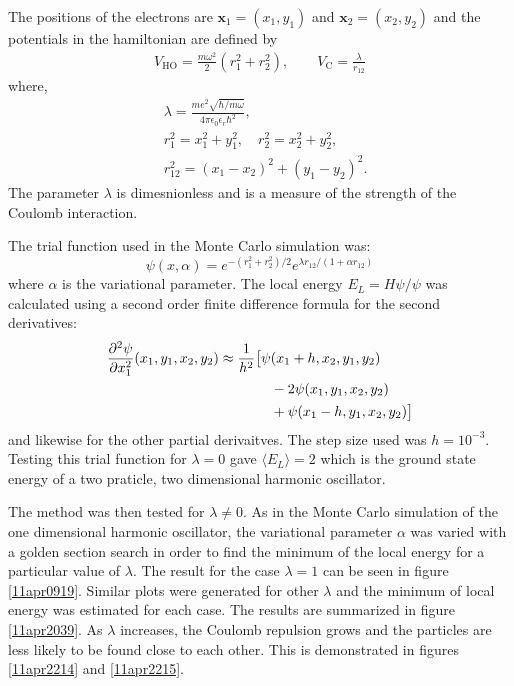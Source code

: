 \documentclass[twocolumn]{article}
\begin{document}
\begin{large}
\begin{figure}[!b]
\end{figure}
The positions of the electrons are $\mathbf{x}_1 = (x_1,y_1)$ and $\mathbf{x}_2 = (x_2,y_2)$ and the potentials in the hamiltonian are defined by
\begin{equation}
    \begin{split}
        V_\text{HO} = \frac{m\omega^2}{2}\left(r_1^2+r_2^2\right), \quad\quad V_\text{C}  = \frac{\lambda}{r_{12}}
    \end{split}
\end{equation}
where,
\begin{equation}
    \begin{split}
        & \lambda = \frac{me^2\sqrt{\hbar/m\omega}}{4\pi\epsilon_0\epsilon_r\hbar^2}, \\ 
        &r_1^2 = x_1^2+y_1^2, \quad r_2^2 = x_2^2+y_2^2, \\ 
        &r_{12}^2 = (x_1-x_2)^2+(y_1-y_2)^2. 
    \end{split}
\end{equation}
The parameter $\lambda$ is dimesnionless and is a measure of the strength of the Coulomb interaction. 


The trial function used in the Monte Carlo simulation was:
\begin{equation}
    \psi(x,\alpha) = e^{-(r_1^2+r_2^2)/2}e^{\lambda r_{12}/(1+\alpha r_{12})}
\end{equation}
where $\alpha$ is the variational parameter. The local energy $E_L=H\psi/\psi$ was calculated using a second order finite difference formula for the second derivatives:
\begin{equation}
    \begin{split}
        \frac{\partial^2\psi}{\partial x_1^2}(x_1,y_1,x_2,y_2) &\approx \frac{1}{h^2}\big[\psi(x_1+h,x_2,y_1,y_2) \\ 
        &\hspace{1.3cm}-2\psi(x_1,y_1,x_2,y_2) \\ 
        &\hspace{1.3cm}+\psi(x_1-h,y_1,x_2,y_2) \big]
    \end{split}
\end{equation}
and likewise for the other partial derivaitves. The step size used was $h=10^{-3}$. Testing this trial function for $\lambda=0$ gave $\langle E_L\rangle = 2$ which is the ground state energy of a two praticle, two dimensional harmonic oscillator. 

The method was then tested for $\lambda\neq 0$. As in the Monte Carlo simulation of the one dimensional harmonic oscillator, the variational parameter $\alpha$ was varied with a golden section search in order to find the minimum of the local energy for a particular value of $\lambda$. The result for the case $\lambda = 1$ can be seen in figure \ref{11apr0919}. Similar plots were generated for other $\lambda$ and the minimum of local energy was estimated for each case. The results are summarized in figure \ref{11apr2039}. As $\lambda$ increases, the Coulomb repulsion grows and the particles are less likely to be found close to each other. This is demonstrated in figures \ref{11apr2214} and \ref{11apr2215}.


\end{large}
\end{document}
